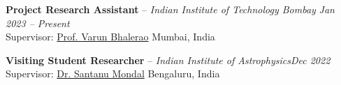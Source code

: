 \textbf{Project Research Assistant} -- \textit{Indian Institute of Technology Bombay}
\hfill \textit{Jan 2023 -- Present} \\
Supervisor: \href{https://www.phy.iitb.ac.in/en/content/prof-varun-bhalerao}{Prof. Varun Bhalerao} \hfill  Mumbai, India


\vspace{0.5em}

\textbf{Visiting Student Researcher} -- \textit{Indian Institute of Astrophysics}\hfill \textit{Dec 2022} \\
Supervisor: \href{https://santanumondal.wixsite.com/horizon}{Dr. Santanu Mondal} \hfill Bengaluru, India